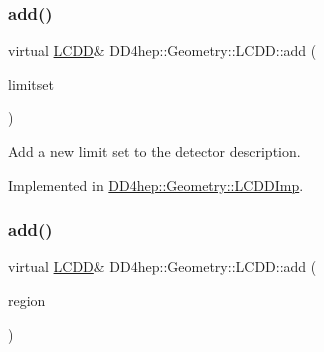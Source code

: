 \hypertarget{class_d_d4hep_1_1_geometry_1_1_l_c_d_d_a2b6a8c58332d26518c9def51f1acbc0d}{}\label{class_d_d4hep_1_1_geometry_1_1_l_c_d_d_a2b6a8c58332d26518c9def51f1acbc0d} 
\subsubsection{\texorpdfstring{add()}{add()}\hspace{0.1cm}{\footnotesize\ttfamily [3/10]}}
{\footnotesize\ttfamily virtual \hyperlink{class_d_d4hep_1_1_geometry_1_1_l_c_d_d}{L\+C\+DD}\& D\+D4hep\+::\+Geometry\+::\+L\+C\+D\+D\+::add (\begin{DoxyParamCaption}\item[{\hyperlink{class_d_d4hep_1_1_geometry_1_1_limit_set}{Limit\+Set}}]{limitset }\end{DoxyParamCaption})\hspace{0.3cm}{\ttfamily [pure virtual]}}



Add a new limit set to the detector description. 



Implemented in \hyperlink{class_d_d4hep_1_1_geometry_1_1_l_c_d_d_imp_acd0d23dbb73da1b5b16169443f9fb975}{D\+D4hep\+::\+Geometry\+::\+L\+C\+D\+D\+Imp}.

\hypertarget{class_d_d4hep_1_1_geometry_1_1_l_c_d_d_a618c1268be853682f6da33777aae71a8}{}\label{class_d_d4hep_1_1_geometry_1_1_l_c_d_d_a618c1268be853682f6da33777aae71a8} 
\subsubsection{\texorpdfstring{add()}{add()}\hspace{0.1cm}{\footnotesize\ttfamily [4/10]}}
{\footnotesize\ttfamily virtual \hyperlink{class_d_d4hep_1_1_geometry_1_1_l_c_d_d}{L\+C\+DD}\& D\+D4hep\+::\+Geometry\+::\+L\+C\+D\+D\+::add (\begin{DoxyParamCaption}\item[{\hyperlink{class_d_d4hep_1_1_geometry_1_1_region}{Region}}]{region }\end{DoxyParamCaption})\hspace{0.3cm}{\ttfamily [pure virtual]}}



